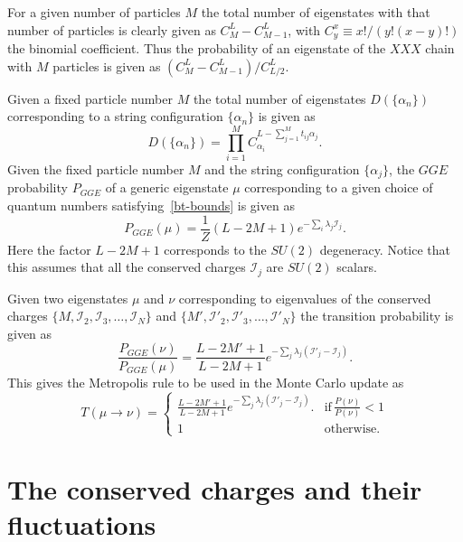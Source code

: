 \documentclass[twocolumn,superscriptaddress,prb,10pt]{revtex4-1}
\begin{document}
For a given number of particles $M$ the total number of eigenstates with 
that number of particles is clearly given as $C_M^L-C_{M-1}^L$, with 
$C_y^x\equiv x!/(y!(x-y)!)$ the binomial coefficient. Thus the probability 
of an eigenstate of the $XXX$ chain with $M$ particles is given as 
$(C_M^L-C_{M-1}^L)/C_{L/2}^L$. 

Given a fixed particle number $M$ the total number of eigenstates $D(\{\alpha_n\})$ 
corresponding to a string configuration $\{\alpha_n\}$ is given as 
%
\begin{equation}
D(\{\alpha_n\})=\prod_{i=1}^MC_{\alpha_i}^{L-\sum_{j=1}^M t_{ij}\alpha_j}.
\end{equation}
%
Given the fixed particle number $M$  and the string configuration $\{\alpha_j\}$, 
the $GGE$ probability $P_{GGE}$ of a generic eigenstate $\mu$ corresponding to a given 
choice of quantum numbers satisfying~\eqref{bt-bounds} is given as 
%
\begin{equation}
P_{GGE}(\mu)=\frac{1}{Z}(L-2M+1)e^{-\sum_i\lambda_j {\mathcal I}_j}.
\end{equation}
%
Here the factor $L-2M+1$ corresponds to the $SU(2)$ degeneracy. Notice that 
this assumes that all the conserved charges ${\mathcal I}_j$ are $SU(2)$ 
scalars. 

Given two eigenstates $\mu$ and $\nu$ corresponding to eigenvalues of the conserved 
charges $\{M,{\mathcal I_2},{\mathcal I}_3,\dots,{\mathcal I}_N\}$ and 
$\{M',{\mathcal I}'_2,{\mathcal I}'_3,\dots,{\mathcal I}'_N\}$ the transition 
probability is given as 
%
\begin{equation}
\frac{P_{GGE}(\nu)}{P_{GGE}(\mu)}=\frac{L-2M'+1}{L-2M+1}e^{-\sum_j
\lambda_j({\mathcal I}'_j-{\mathcal I}_j)}.
\end{equation}
%
This gives the Metropolis rule to be used in the Monte Carlo update as 
%
\begin{displaymath}
T(\mu\rightarrow\nu)=\left\{
\begin{array}{cc}
\frac{L-2M'+1}{L-2M+1}e^{-\sum_j\lambda_j({\mathcal I}'_j-{\mathcal I}_j)}.  &  \textrm{if}\,\frac{P(\nu)}{P(\nu)}<1\\
1									     &  \textrm{otherwise}.
\end{array}
\right.
\end{displaymath}
%



\section{The conserved charges and their fluctuations}
\end{document}
